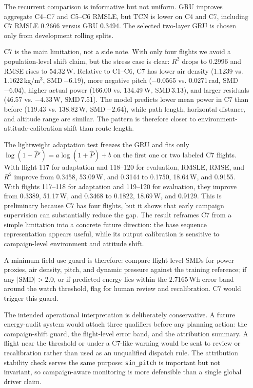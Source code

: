 \documentclass[runningheads,a4paper]{llncs}
\begin{document}
The recurrent comparison is informative but not uniform. GRU improves aggregate C4--C7 and C5--C6 RMSLE, but TCN is lower on C4 and C7, including C7 RMSLE 0.2666 versus GRU 0.3494. The selected two-layer GRU is chosen only from development rolling splits.

C7 is the main limitation, not a side note. With only four flights we avoid a population-level shift claim, but the stress case is clear: $R^2$ drops to 0.2996 and RMSE rises to 54.32\,W. Relative to C1--C6, C7 has lower air density (1.1239 vs. 1.1622\,kg/m$^3$, SMD\,$-6.19$), more negative pitch ($-0.0565$ vs. 0.0271\,rad, SMD\,$-6.04$), higher actual power (166.00 vs. 134.49\,W, SMD\,3.13), and larger residuals (46.57 vs. $-4.33$\,W, SMD\,7.51). The model predicts lower mean power in C7 than before (119.43 vs. 138.82\,W, SMD\,$-2.64$), while path length, horizontal distance, and altitude range are similar. The pattern is therefore closer to environment-attitude-calibration shift than route length.

The lightweight adaptation test freezes the GRU and fits only $\log(1+\hat{P}')=a\log(1+\hat{P})+b$ on the first one or two labeled C7 flights. With flight 117 for adaptation and 118--120 for evaluation, RMSLE, RMSE, and $R^2$ improve from 0.3458, 53.09\,W, and 0.3144 to 0.1750, 18.64\,W, and 0.9155. With flights 117--118 for adaptation and 119--120 for evaluation, they improve from 0.3389, 51.17\,W, and 0.3468 to 0.1822, 18.69\,W, and 0.9129. This is preliminary because C7 has four flights, but it shows that early campaign supervision can substantially reduce the gap. The result reframes C7 from a simple limitation into a concrete future direction: the base sequence representation appears useful, while its output calibration is sensitive to campaign-level environment and attitude shift.

A minimum field-use guard is therefore: compare flight-level SMDs for power proxies, air density, pitch, and dynamic pressure against the training reference; if any $|\mathrm{SMD}|>2.0$, or if predicted energy lies within the 2.7165\,Wh error band around the watch threshold, flag for human review and recalibration. C7 would trigger this guard.

The intended operational interpretation is deliberately conservative. A future energy-audit system would attach three qualifiers before any planning action: the campaign-shift guard, the flight-level error band, and the attribution summary. A flight near the threshold or under a C7-like warning would be sent to review or recalibration rather than used as an unqualified dispatch rule. The attribution stability check serves the same purpose: \texttt{sin\_pitch} is important but not invariant, so campaign-aware monitoring is more defensible than a single global driver claim.
\end{document}
